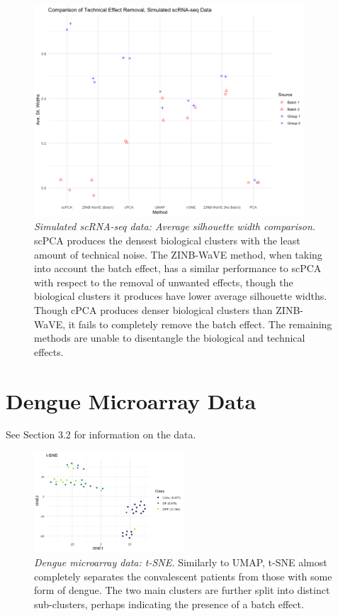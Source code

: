 \documentclass{article}
\begin{document}
\begin{figure}[!htbp]
    \centering
    \includegraphics[width=0.9\textwidth]{figures/technical_effect_removal_sim}
    \caption{{\em Simulated scRNA-seq data: Average silhouette width comparison.}
    scPCA produces the densest biological clusters with the least amount of technical noise. The ZINB-WaVE method, when taking into account the batch effect, has a similar performance to scPCA with respect to the removal of unwanted effects, though the biological clusters it produces have lower average silhouette widths. Though cPCA produces denser biological clusters than ZINB-WaVE, it fails to completely remove the batch effect. The remaining methods are unable to disentangle the biological and technical effects. 
    }
    \label{fig:ave_sil_widths}
\end{figure}

\FloatBarrier

\section{Dengue Microarray Data}\label{sup_dengue}

See Section 3.2 %
for information on the data.

\begin{figure}[!htbp]
    \centering
    \includegraphics[width=0.5\textwidth]{figures/dengue_tsne}
    \caption{
    {\em Dengue microarray data: t-SNE.}
    Similarly to UMAP, t-SNE almost completely separates the convalescent patients from those with some form of dengue. The two main clusters are further split into distinct sub-clusters, perhaps indicating the presence of a batch effect. 
    }
    \label{fig:dengue_tsne}
\end{figure}
\end{document}
